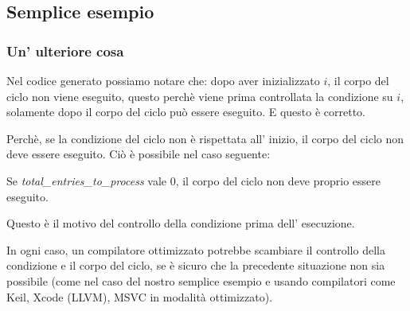 \subsection{Semplice esempio}





\subsubsection{Un' ulteriore cosa}

Nel codice generato possiamo notare che: 
dopo aver inizializzato $i$, il corpo del ciclo non viene eseguito,
questo perchè viene prima controllata la condizione su $i$, solamente dopo il corpo del ciclo può essere eseguito.
E questo è corretto. 

Perchè, se la condizione del ciclo non è rispettata all' inizio,
 il corpo del ciclo non deve essere eseguito.
Ciò è possibile nel caso seguente:



Se \emph{total\_entries\_to\_process} vale 0, il corpo del ciclo non deve proprio essere eseguito.

Questo è il motivo del controllo della condizione prima dell' esecuzione.

In ogni caso, un compilatore ottimizzato potrebbe scambiare il controllo della condizione e il corpo del ciclo,
se è sicuro che la precedente situazione non sia possibile
(come nel caso del nostro semplice esempio e usando compilatori come Keil, Xcode (LLVM), MSVC in modalità ottimizzato).
